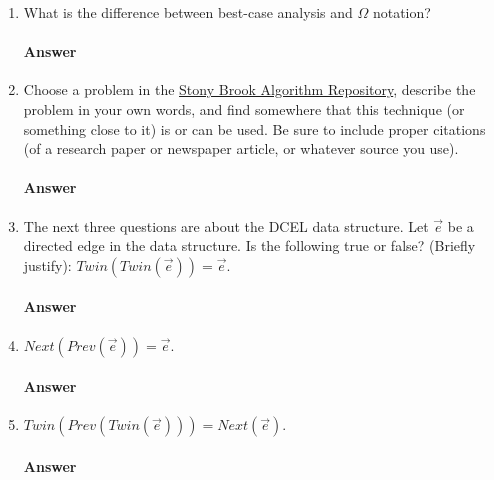 \documentclass{article}
\begin{document}
\begin{enumerate}
    \item What is the difference between best-case analysis and $\Omega$
        notation?

        \paragraph{Answer}

    \item Choose a problem in the
        \href{https://www3.cs.stonybrook.edu/~algorith/major_section/1.6.shtml}{Stony Brook Algorithm
        Repository},
        describe the problem in your own words, and find somewhere that this
        technique (or something close to it) is or can be used.  Be sure to
        include proper citations (of a research paper or newspaper article, or
        whatever source you use).

        \paragraph{Answer}

    \item The next three questions are about the DCEL data structure.  Let
        $\vec{e}$ be a directed edge in the data structure.  Is the following
        true or false? (Briefly justify): $Twin(Twin(\vec{e}))=\vec{e}$.

        \paragraph{Answer}

    \item $Next(Prev(\vec{e}))=\vec{e}$.

        \paragraph{Answer}

    \item $Twin(Prev(Twin(\vec{e})))=Next(\vec{e})$.

        \paragraph{Answer}

\end{enumerate}
\end{document}
